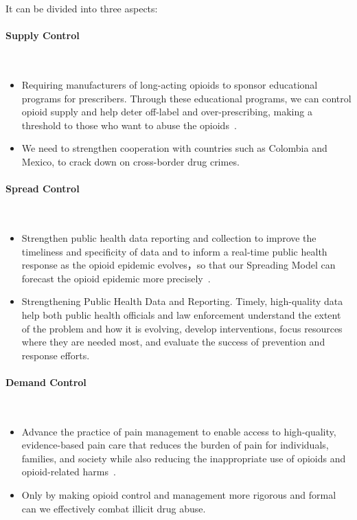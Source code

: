 \documentclass{mcmthesis}
\begin{document}
    It can be divided into three aspects:
\paragraph{\textbf{Supply Control}}

~\smallskip

\begin{itemize}
    \item Requiring manufacturers of long-acting opioids to sponsor educational programs for prescribers. Through these educational programs, we can control opioid supply and help deter off-label and over-prescribing, making a threshold to those who want to abuse the opioids~\cite{FUSTER2018487}.
    \item We need to strengthen cooperation with countries such as Colombia and Mexico, to crack down on cross-border drug crimes.
\end{itemize}

\paragraph{\textbf{Spread Control}}

~\smallskip

\begin{itemize}
    \item Strengthen public health data reporting and collection to improve the timeliness and specificity of data and to inform a real-time public health response as the opioid epidemic evolves，so that our Spreading Model can forecast the opioid epidemic more precisely~\cite{AWSARE2019}.
    \item Strengthening Public Health Data and Reporting. Timely, high-quality data help both public health officials and law enforcement understand the extent of the problem and how it is evolving, develop interventions, focus resources where they are needed most, and evaluate the success of prevention and response efforts. 
\end{itemize}

\paragraph{\textbf{Demand Control}}
~\smallskip

\begin{itemize}
    \item Advance the practice of pain management to enable access to high-quality, evidence-based pain care that reduces the burden of pain for individuals, families, and society while also reducing the inappropriate use of opioids and opioid-related harms~\cite{SEIGERMAN201928}.
    \item Only by making opioid control and management more rigorous and formal can we effectively combat illicit drug abuse.
\end{itemize}
\end{document}
